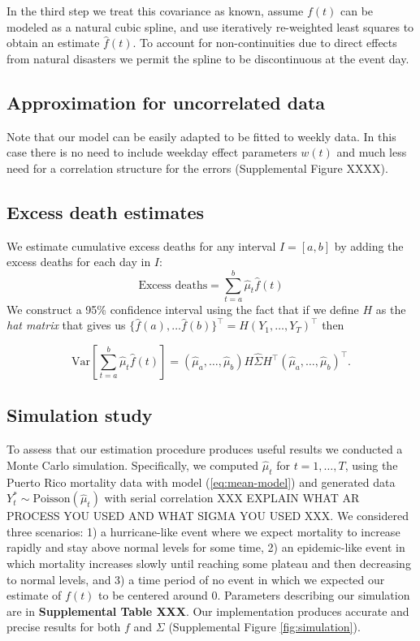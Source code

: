 \documentclass[11pt]{article}
\begin{document}
In the third step we treat this covariance as known, assume $f(t)$ can be modeled as a natural cubic spline, and use iteratively re-weighted least squares to obtain an estimate $\hat{f}(t)$. To account for non-continuities due to direct effects from natural disasters we permit the spline to be discontinuous at the event day. 

\subsection{Approximation for uncorrelated data}
Note that our model can be easily adapted to be fitted to weekly data. In this case there is no need to include weekday effect parameters $w(t)$ and much less need for a correlation structure for the errors (Supplemental Figure XXXX). 

\subsection{Excess death estimates}
\label{subsec:excess-deaths}
We estimate cumulative excess deaths for any interval $I = [a, b]$ 
by adding the excess deaths for each day
in $I$: 
\begin{equation*}
    \mbox{Excess deaths} = \sum_{t = a}^b \hat{\mu}_t \hat{f}(t) 
\end{equation*}
We construct a 95\% confidence interval using the fact that if we define $H$ as the \emph{hat matrix} that gives us 
$\{ \hat{f}(a), \dots \hat{f}(b) \}^\top = H (Y_1, \dots, Y_T)^\top$ then

 \begin{equation*}
    \mbox{Var}\left[\sum_{t = a}^b \hat{\mu}_t \hat{f}(t) \right] = (\hat{\mu}_a,\dots,\hat{\mu}_b) H \hat{\Sigma} H^\top (\hat{\mu}_a,\dots,\hat{\mu}_b)^\top.
 \end{equation*}
 
\subsection{Simulation study}
To assess that our estimation procedure produces useful results we conducted a Monte Carlo simulation. Specifically, we computed $\hat{\mu}_t$ for $t=1,\ldots, T$, using the Puerto Rico mortality data with model (\ref{eq:mean-model}) and generated data $Y_t^* \sim \mbox{Poisson}(\hat{\mu}_t)$ with serial correlation XXX EXPLAIN WHAT AR PROCESS YOU USED AND WHAT SIGMA YOU USED XXX. We considered three scenarios: 1) a hurricane-like event where we expect mortality to increase rapidly and stay above normal levels for some time, 2) an epidemic-like event in which mortality increases slowly until reaching some plateau and then decreasing to normal levels, and 3) a time period of no event in which we expected our estimate of $f(t)$ to be centered around 0. Parameters describing our simulation are in \textbf{Supplemental Table XXX}. Our implementation produces accurate and precise results for both $f$ and $\Sigma$ (Supplemental Figure \ref{fig:simulation}).
\end{document}
